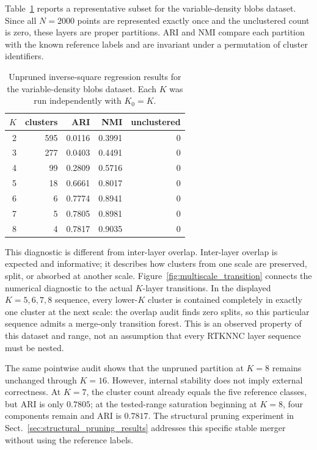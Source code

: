 \documentclass[pdflatex,sn-mathphys-num]{sn-jnl}
\begin{document}
Table~\ref{tab:partition_diagnostic} reports a representative subset for the variable-density blobs dataset. Since all $N=2000$ points are represented exactly once and the unclustered count is zero, these layers are proper partitions. ARI and NMI compare each partition with the known reference labels and are invariant under a permutation of cluster identifiers.

\begin{table}[t]
\caption{Unpruned inverse-square regression results for the variable-density blobs dataset. Each $K$ was run independently with $K_0=K$.}\label{tab:partition_diagnostic}
\centering
\begin{tabular}{rrrrr}
\toprule
$K$ & clusters & ARI & NMI & unclustered\\
\midrule
2 & 595 & 0.0116 & 0.3991 & 0\\
3 & 277 & 0.0403 & 0.4491 & 0\\
4 & 99  & 0.2809 & 0.5716 & 0\\
5 & 18  & 0.6661 & 0.8017 & 0\\
6 & 6   & 0.7774 & 0.8941 & 0\\
7 & 5   & 0.7805 & 0.8981 & 0\\
8 & 4   & 0.7817 & 0.9035 & 0\\
\bottomrule
\end{tabular}
\end{table}

This diagnostic is different from inter-layer overlap. Inter-layer overlap is
expected and informative; it describes how clusters from one scale are
preserved, split, or absorbed at another scale.  Figure~\ref{fig:multiscale_transition}
connects the numerical diagnostic to the actual $K$-layer transitions.  In the
displayed $K=5,6,7,8$ sequence, every lower-$K$ cluster is contained completely
in exactly one cluster at the next scale: the overlap audit finds zero splits,
so this particular sequence admits a merge-only transition forest.  This is an
observed property of this dataset and range, not an assumption that every
RTKNNC layer sequence must be nested.

The same pointwise audit shows that the unpruned partition at $K=8$ remains
unchanged through $K=16$.  However, internal stability does not imply external
correctness.  At $K=7$, the cluster count already equals the five
reference classes, but ARI is only $0.7805$; at the tested-range saturation
beginning at $K=8$, four components remain and ARI is $0.7817$.  The structural
pruning experiment in Sect.~\ref{sec:structural_pruning_results} addresses this
specific stable merger without using the reference labels.
\end{document}
